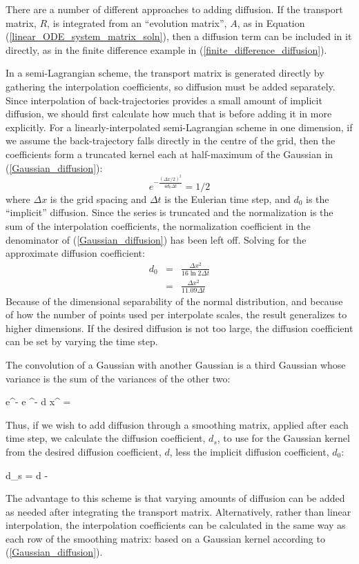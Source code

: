There are a number of different approaches to adding diffusion.
If the transport matrix, $R$, is integrated from an ``evolution matrix'',
$A$, as in Equation (\ref{linear_ODE_system_matrix_soln}), then a diffusion
term can be included in it directly, 
as in the finite difference example in (\ref{finite_difference_diffusion}).

In a semi-Lagrangian scheme, the transport matrix is generated directly
by gathering the interpolation coefficients, so diffusion must be added
separately.
Since interpolation of back-trajectories provides a small amount of implicit
diffusion, we should first calculate how much that is before adding it in
more explicitly.
For a linearly-interpolated semi-Lagrangian scheme in one dimension, 
if we assume the back-trajectory falls directly in
the centre of the grid, then the coefficients form a truncated kernel each
at half-maximum of the Gaussian in (\ref{Gaussian_diffusion}):
\begin{equation}
e^{-\frac{\left(\Delta x/2 \right)^2}{4d_0 \Delta t}} = 1/2
\end{equation}
where $\Delta x$ is the grid spacing and $\Delta t$ is the Eulerian time step,
and $d_0$ is the ``implicit'' diffusion.
Since the series is truncated and the normalization is the sum of the 
interpolation coefficients, the normalization coefficient in the denominator
of (\ref{Gaussian_diffusion}) has been left off. 
Solving for the approximate diffusion coefficient:
\begin{eqnarray}
	d_0 & = & \frac{\Delta x^2}{16 \ln 2 \Delta t} \\
	& = & \frac{\Delta x^2}{11.09 \Delta t}
\end{eqnarray}
Because of the dimensional separability of the normal distribution,
and because of how the number of points used per interpolate scales, 
the result generalizes to higher dimensions.
If the desired diffusion is not too large, the diffusion coefficient can
be set by varying the time step.

The convolution of a Gaussian with another Gaussian is a third Gaussian whose variance is the sum of the variances of the other two:
\begin{eqnl}
	 \int e^{-} e ^{-} \mathrm d x^\prime
	= 
\end{eqnl}
Thus, if we wish to add diffusion through a smoothing matrix,
applied after each time step, we calculate the diffusion coefficient, $d_s$,
to use for the Gaussian kernel from the desired diffusion coefficient, $d$,
less the implicit diffusion coefficient, $d_0$:
\begin{eqnl}
	d_s = d - 
\end{eqnl}
The advantage to this scheme is that varying amounts of diffusion can be
added as needed after integrating the transport matrix.
Alternatively, rather than linear interpolation, the interpolation
coefficients can be calculated in the same way as each row of the smoothing
matrix: based on a Gaussian kernel according to (\ref{Gaussian_diffusion}).

